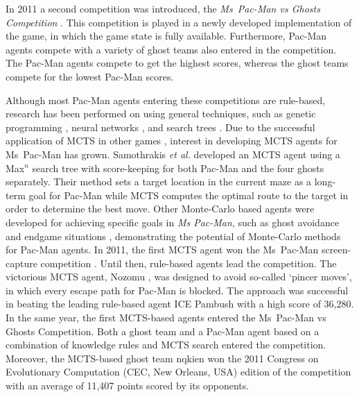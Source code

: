 \documentclass[journal]{IEEEtran}
\begin{document}
In 2011 a second competition was introduced, the \emph{Ms~Pac-Man vs Ghosts Competition} \cite{mspacmanvsghost}. This competition is played in a newly developed implementation of the game, in which the game state is fully available. Furthermore, Pac-Man agents compete with a variety of ghost teams also entered in the competition. The Pac-Man agents compete to get the highest scores, whereas the ghost teams compete for the lowest Pac-Man scores.

Although most Pac-Man agents entering these competitions are rule-based, research has been performed on using general techniques, such as genetic programming \cite{alhejali2010evolving}, neural networks \cite{lucas2005evolving}, and search trees \cite{robles2009simple}. Due to the successful application of MCTS in other games \cite{brownesurvey}, interest in developing MCTS agents for Ms~Pac-Man has grown. Samothrakis \emph{et al.} \cite{samothrakis2011fast} developed an MCTS agent using a Max$^{n}$ search tree with score-keeping for both Pac-Man and the four ghosts separately. Their method sets a target location in the current maze as a long-term goal for Pac-Man while MCTS computes the optimal route to the target in order to determine the best move. Other Monte-Carlo based agents were developed for achieving specific goals in {\it{Ms Pac-Man}}, such as ghost avoidance \cite{tong2010monteghost} and endgame situations \cite{tong2011monteendgame}, demonstrating the potential of Monte-Carlo methods for Pac-Man agents. 
In 2011, the first MCTS agent won the Ms~Pac-Man screen-capture competition \cite{mspacmanscreencap}. Until then, rule-based agents lead the competition. The victorious MCTS agent, {\sc Nozomu} \cite{ikehata2011monte}, was designed to avoid so-called `pincer moves', in which every escape path for Pac-Man is blocked. The approach was successful in beating the leading rule-based agent {\sc ICE Pambush} \cite{thawonmas2010evolution} with a high score of 36,280. In the same year, the first MCTS-based agents entered the Ms~Pac-Man vs Ghosts Competition. Both a ghost team \cite{iceguct, iceguctcig11} and a Pac-Man agent \cite{icepambushcig11} based on a combination of knowledge rules and MCTS search entered the competition. Moreover, the MCTS-based ghost team {\sc nqkien} \cite{iceguct, nguyen2011applying, nguyenmonte} won the 2011 Congress on Evolutionary Computation (CEC, New Orleans, USA) \cite{cec11rankings} edition of the competition with an average of 11,407 points scored by its opponents. 
\end{document}

